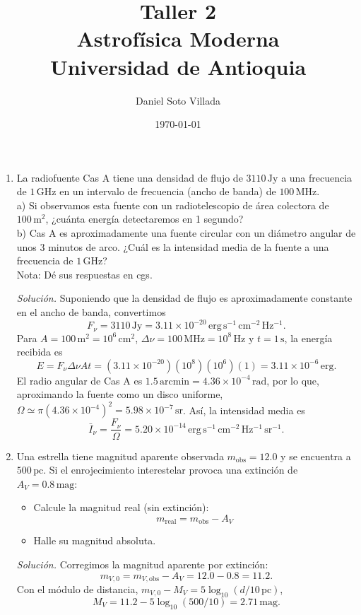 \documentclass[11pt]{article}
\title{Taller 2\\[0.5em]
\large Astrofísica Moderna\\
Universidad de Antioquia}
\author{Daniel Soto Villada}
\date{\today}
\begin{document}
\maketitle

\begin{enumerate}
    \item La radiofuente Cas A tiene una densidad de flujo de $3110\,\mathrm{Jy}$ a una frecuencia de $1\,\mathrm{GHz}$ en un intervalo de frecuencia (ancho de banda) de $100\,\mathrm{MHz}$.\\
    a) Si observamos esta fuente con un radiotelescopio de área colectora de $100\,\mathrm{m}^2$, ¿cuánta energía detectaremos en 1 segundo?\\
    b) Cas A es aproximadamente una fuente circular con un diámetro angular de unos 3 minutos de arco. ¿Cuál es la intensidad media de la fuente a una frecuencia de $1\,\mathrm{GHz}$?\\
    Nota: Dé sus respuestas en cgs.

    \textit{Solución.} Suponiendo que la densidad de flujo es aproximadamente constante en el ancho de banda, convertimos
    \[
        F_\nu=3110\,\mathrm{Jy}=3.11\times10^{-20}\,\mathrm{erg\,s^{-1}\,cm^{-2}\,Hz^{-1}}.
    \]
    Para $A=100\,\mathrm{m^2}=10^6\,\mathrm{cm^2}$, $\Delta\nu=100\,\mathrm{MHz}=10^8\,\mathrm{Hz}$ y $t=1\,\mathrm{s}$, la energía recibida es
    \[
        E=F_\nu\Delta\nu At=(3.11\times10^{-20})(10^8)(10^6)(1)
        =3.11\times10^{-6}\,\mathrm{erg}.
    \]
    El radio angular de Cas A es $1.5\,\mathrm{arcmin}=4.36\times10^{-4}\,\mathrm{rad}$, por lo que, aproximando la fuente como un disco uniforme, $\Omega\simeq\pi(4.36\times10^{-4})^2=5.98\times10^{-7}\,\mathrm{sr}$. Así, la intensidad media es
    \[
        \bar I_\nu=\frac{F_\nu}{\Omega}=5.20\times10^{-14}\,\mathrm{erg\,s^{-1}\,cm^{-2}\,Hz^{-1}\,sr^{-1}}.
    \]
    \parencite[Secs. 7.3.1.2, pp. 236--238; Sec. 8.1, pp. 255--260]{chaparro2026}

    \item Una estrella tiene magnitud aparente observada $m_{\mathrm{obs}} = 12.0$ y se encuentra a $500\,\mathrm{pc}$. Si el enrojecimiento interestelar provoca una extinción de $A_V = 0.8\,\mathrm{mag}$:
    \begin{itemize}
        \item Calcule la magnitud real (sin extinción):
        \[
            m_{\mathrm{real}} = m_{\mathrm{obs}} - A_V
        \]
        \item Halle su magnitud absoluta.
    \end{itemize}
    \textit{Solución.} Corregimos la magnitud aparente por extinción:
    \[
        m_{V,0}=m_{V,\mathrm{obs}}-A_V=12.0-0.8=11.2.
    \]
    Con el módulo de distancia, $m_{V,0}-M_V=5\log_{10}(d/10\,\mathrm{pc})$,
    \[
        M_V=11.2-5\log_{10}(500/10)=2.71\,\mathrm{mag}.
    \]
    \parencite[Sec. 7.3.3, pp. 241--248; Sec. 12.2.1, pp. 378--379]{chaparro2026}


\end{enumerate}
\end{document}
